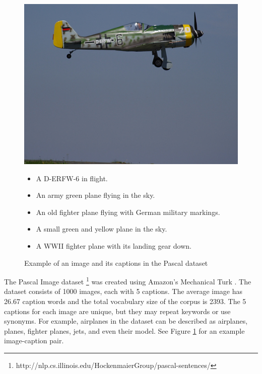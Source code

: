 \begin{figure}[t]
  \begin{minipage}{0.45\linewidth}
    \centering
    \includegraphics[width=.8\textwidth]{chpt9_ia/figures/img_3.jpg}
  \end{minipage}
  \begin{minipage}[t]{0.45\linewidth}
    \vspace{-1in}
    \centering
    \footnotesize
    \begin{itemize}
    \item A D-ERFW-6 in flight.
    \item An army green plane flying in the sky.
    \item An old fighter plane flying with German military markings.
    \item A small green and yellow plane in the sky.
    \item A WWII fighter plane with its landing gear down.
    \end{itemize}
  \end{minipage}
  \caption{Example of an image and its captions in the Pascal dataset}
  \label{fig:chpt9:pascal}
\end{figure}

The Pascal Image dataset
\footnote{http://nlp.cs.illinois.edu/HockenmaierGroup/pascal-sentences/} was created using
Amazon's Mechanical Turk \cite{rashtchian2010collecting}. The dataset consists of 1000
images, each with 5 captions. The average image has 26.67 caption words and the total
vocabulary size of the corpus is 2393. The 5 captions for each image are unique, but they
may repeat keywords or use synonyms.  For example, airplanes in the dataset can be
described as airplanes, planes, fighter planes, jets, and even their model. See Figure
\ref{fig:chpt9:pascal} for an example image-caption pair.

